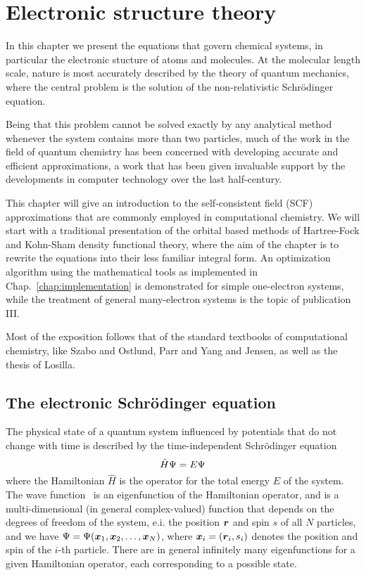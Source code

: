 \chapter{Electronic structure theory}\label{chap:chemistry}
In this chapter we present the equations that govern chemical systems, in particular
the electronic stucture of atoms and molecules. At the molecular length scale, nature
is most accurately described by the theory of quantum mechanics, where the central
problem is the solution of the non-relativistic Schr\"{o}dinger equation.

Being that this problem cannot be solved exactly by any analytical method whenever
the system contains more than two particles, much of the work in the field of quantum
chemistry has been concerned with developing accurate and efficient approximations,
a work that has been given invaluable support by the developments in computer
technology over the last half-century.

This chapter will give an introduction to the self-consistent field (SCF) approximations 
that are commonly employed in computational chemistry. We will start with a traditional 
presentation of the orbital based methods of Hartree-Fock and Kohn-Sham density functional 
theory, where the aim of the chapter is to rewrite the equations into their less familiar 
integral form. An optimization algorithm using the mathematical tools as implemented in 
Chap.~\ref{chap:implementation} is demonstrated for simple one-electron systems, while 
the treatment of general many-electron systems is the topic of publication III.

Most of the exposition follows that of the standard textbooks of computational chemistry, 
like Szabo and Ostlund\cite{Szabo-Ostlund:1982}, Parr and Yang\cite{Parr-Yang:1989} and 
Jensen\cite{Jensen:2007}, as well as the thesis of Losilla\cite{Losilla_thesis:2013}.

\section{The electronic Schr\"{o}dinger equation}\label{sec:schrodinger}
The physical state of a quantum system influenced by potentials that do not change
with time is described by the time-independent Schr\"{o}dinger equation 
\begin{equation}
    \label{eq:mol_schr}
    \hat{H}\Psi = E\Psi
\end{equation}
where the Hamiltonian $\hat{H}$ is the operator for the total energy $E$ of the system.
The wave function \Wavefunction\ is an eigenfunction of the Hamiltonian operator, 
and is a multi-dimensional (in general complex-valued) function that depends on the 
degrees of freedom of the system, e.i. the position $\boldsymbol r$ and spin $s$ of all $N$ 
particles, and we have $\Psi=\Psi(\boldsymbol x_1,\boldsymbol x_2,\dots,\boldsymbol x_N)$, 
where $\boldsymbol x_i=(\boldsymbol r_i,s_i)$ denotes the position and spin of the $i$-th particle. 
There are in general infinitely many eigenfunctions for a given Hamiltonian operator,
each corresponding to a possible state. 

